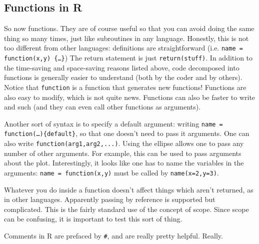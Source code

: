 \subsection{Functions in R}
So now functions. They are of course useful so that you can avoid doing the same thing so many times, just like subroutines in any language. Honestly, this is not too different from other languages: definitions are straightforward (i.e. \texttt{name = function(x,y) \{\dots\}}) The return statement is just \texttt{return(stuff)}. In addition to the time-saving and space-saving reasons listed above, code decomposed into functions is generally easier to understand (both by the coder and by others). Notice that \texttt{function} is a function that generates new functions! Functions are also easy to modify, which is not quite news. Functions can also be faster to write and such (and they can even call other functions as arguments).

Another sort of syntax is to specify a default argument: writing \texttt{name = function(\dots)\{default\}}, so that one doesn't need to pass it arguments. One can also write \texttt{function(arg1,arg2,...)}. Using the ellipse allows one to pass any number of other arguments. For example, this can be used to pass arguments about the plot. Interestingly, it looks like one has to name the variables in the arguments: \texttt{name = function(x,y)} must be called by \texttt{name(x=2,y=3)}.

Whatever you do inside a function doesn't affect things which aren't returned, as in other languages. Apparently passing by reference is supported but complicated. This is the fairly standard use of the concept of scope. Since scope can be confusing, it is important to test this sort of thing.

Comments in R are prefaced by \verb+#+, and are really pretty helpful. Really.

